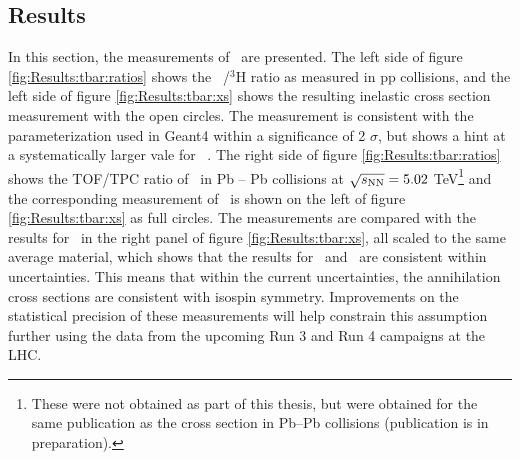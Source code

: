 \subsection{Results}
In this section, the measurements of \sigmainelH\ are presented. The left side of figure \ref{fig:Results:tbar:ratios} shows the \atrit\ /$^3\mathrm{H}$ ratio as measured in pp collisions, and the left side of figure \ref{fig:Results:tbar:xs} shows the resulting inelastic cross section measurement with the open circles. The measurement is consistent with the parameterization used in Geant4 within a significance of 2 $\sigma$, but shows a hint at a systematically larger vale for \sigmainelH\ . The right side of figure \ref{fig:Results:tbar:ratios} shows the TOF/TPC ratio of \atrit\ in Pb -- Pb collisions at $\sqrt{s_{\rm{NN}}}=5.02$ TeV\footnote{These were not obtained as part of this thesis, but were obtained for the same publication as the cross section in Pb--Pb collisions (publication is in preparation).} and the corresponding measurement of \sigmainelH\ is shown on the left of figure \ref{fig:Results:tbar:xs} as full circles. The measurements are compared with the results for \ahe\ in the right panel of figure \ref{fig:Results:tbar:xs}, all scaled to the same average material, which shows that the results for \atrit\ and \ahe\ are consistent within uncertainties. This means that within the current uncertainties, the annihilation cross sections are consistent with isospin symmetry. Improvements on the statistical precision of these measurements will help constrain this assumption further using the data from the upcoming Run 3 and Run 4 campaigns at the LHC. 

